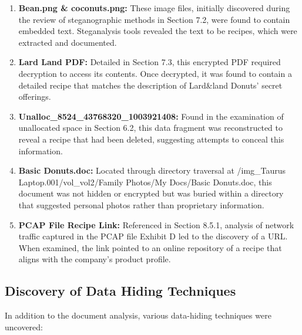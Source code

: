 \begin{enumerate}
    \item \textbf{Bean.png \& coconuts.png:} These image files, initially discovered during the review of steganographic methods in Section 7.2, were found to contain embedded text. Steganalysis tools revealed the text to be recipes, which were extracted and documented.
    
    \item \textbf{Lard Land PDF:} Detailed in Section 7.3, this encrypted PDF required decryption to access its contents. Once decrypted, it was found to contain a detailed recipe that matches the description of Lard\&land Donuts' secret offerings.
    
    \item \textbf{Unalloc\_8524\_43768320\_1003921408:} Found in the examination of unallocated space in Section 6.2, this data fragment was reconstructed to reveal a recipe that had been deleted, suggesting attempts to conceal this information.
    
    \item \textbf{Basic Donuts.doc:} Located through directory traversal at /img\_Taurus Laptop.001/vol\_vol2/Family Photos/My Docs/Basic Donuts.doc, this document was not hidden or encrypted but was buried within a directory that suggested personal photos rather than proprietary information.
    
    \item \textbf{PCAP File Recipe Link:} Referenced in Section 8.5.1, analysis of network traffic captured in the PCAP file Exhibit D led to the discovery of a URL. When examined, the link pointed to an online repository of a recipe that aligns with the company's product profile.
\end{enumerate}

\subsection{Discovery of Data Hiding Techniques}
In addition to the document analysis, various data-hiding techniques were uncovered:

